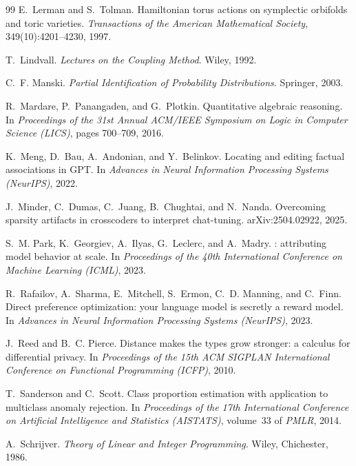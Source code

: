 \documentclass[11pt]{article}
\theoremstyle{definition}
\theoremstyle{remark}
\begin{document}
\begin{thebibliography}{99}
E.~Lerman and S.~Tolman.
\newblock Hamiltonian torus actions on symplectic orbifolds and toric varieties.
\newblock \emph{Transactions of the American Mathematical Society}, 349(10):4201--4230, 1997.

T.~Lindvall.
\newblock \emph{Lectures on the Coupling Method}.
\newblock Wiley, 1992.

C.~F. Manski.
\newblock \emph{Partial Identification of Probability Distributions}.
\newblock Springer, 2003.

R.~Mardare, P.~Panangaden, and G.~Plotkin.
\newblock Quantitative algebraic reasoning.
\newblock In \emph{Proceedings of the 31st Annual ACM/IEEE Symposium on Logic in Computer Science
  (LICS)}, pages 700--709, 2016.

K.~Meng, D.~Bau, A.~Andonian, and Y.~Belinkov.
\newblock Locating and editing factual associations in {GPT}.
\newblock In \emph{Advances in Neural Information Processing Systems (NeurIPS)}, 2022.

J.~Minder, C.~Dumas, C.~Juang, B.~Chughtai, and N.~Nanda.
\newblock Overcoming sparsity artifacts in crosscoders to interpret chat-tuning.
\newblock arXiv:2504.02922, 2025.

S.~M. Park, K.~Georgiev, A.~Ilyas, G.~Leclerc, and A.~Madry.
: attributing model behavior at scale.
\newblock In \emph{Proceedings of the 40th International Conference on Machine Learning (ICML)}, 2023.

R.~Rafailov, A.~Sharma, E.~Mitchell, S.~Ermon, C.~D. Manning, and C.~Finn.
\newblock Direct preference optimization: your language model is secretly a reward model.
\newblock In \emph{Advances in Neural Information Processing Systems (NeurIPS)}, 2023.

J.~Reed and B.~C. Pierce.
\newblock Distance makes the types grow stronger: a calculus for differential privacy.
\newblock In \emph{Proceedings of the 15th ACM SIGPLAN International Conference on Functional
  Programming (ICFP)}, 2010.

T.~Sanderson and C.~Scott.
\newblock Class proportion estimation with application to multiclass anomaly rejection.
\newblock In \emph{Proceedings of the 17th International Conference on Artificial Intelligence and
  Statistics (AISTATS)}, volume~33 of \emph{PMLR}, 2014.

A.~Schrijver.
\newblock \emph{Theory of Linear and Integer Programming}.
\newblock Wiley, Chichester, 1986.


\end{thebibliography}
\end{document}
